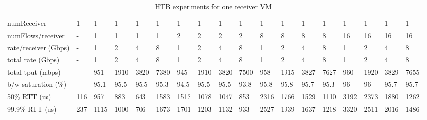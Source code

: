 \begin{table*}[!tb]
\centering
{\setlength{\tabcolsep}{1pt}
\begin{tabular}{|l|l|llll|llll|llll|llll|}
\hline
numReceiver          & 1   & 1    & 1    & 1   & 1    & 1    & 1    & 1    & 1   & 1    & 1     & 1      & 1       & 1    & 1    & 1      & 1       \\
numFlows/receiver    & -   & 1    & 1    & 1   & 1    & 2    & 2    & 2    & 2   & 8    & 8     & 8      & 8       & 16   & 16   & 16     & 16      \\
rate/receiver (Gbps) & -   & 1    & 2    & 4   & 8    & 1    & 2    & 4    & 8   & 1    & 2     & 4      & 8       & 1    & 2    & 4      & 8       \\
total rate (Gbps)    & -   & 1    & 2    & 4   & 8    & 1    & 2    & 4    & 8   & 1    & 2     & 4      & 8       & 1    & 2    & 4      & 8       \\
\hline
total tput (mbps)    & -   & 951  & 1910 & 3820 & 7380  & 945  & 1910 & 3820 & 7500 & 958  & 1915  & 3827   & 7627    & 960  & 1920 & 3829   & 7655    \\
b/w saturation (\%)  & -   & 95.1 & 95.5 & 95.5 & 95.3  & 94.5 & 95.5 & 95.5 & 93.8 & 95.8 & 95.8  & 95.7   & 95.3    & 96   & 96   & 95.7   & 95.7 \\
\hline
50\% RTT (us)        & 116 & 957  & 883  & 643 & 1583 & 1513 & 1078 & 1047 & 853 & 2316 & 1766  & 1529   & 1110    & 3192 & 2373 & 1880   & 1262    \\
99.9\% RTT (us)      & 237 & 1115 & 1000 & 706 & 1673 & 1701 & 1203 & 1132 & 933 & 2527 & 1939  & 1637   & 1208    & 3320 & 2511 & 2016   & 1486   \\
\hline
\end{tabular}}
\caption{HTB experiments for one receiver VM}
\label{tbl:htb-1rec} 
\end{table*}

